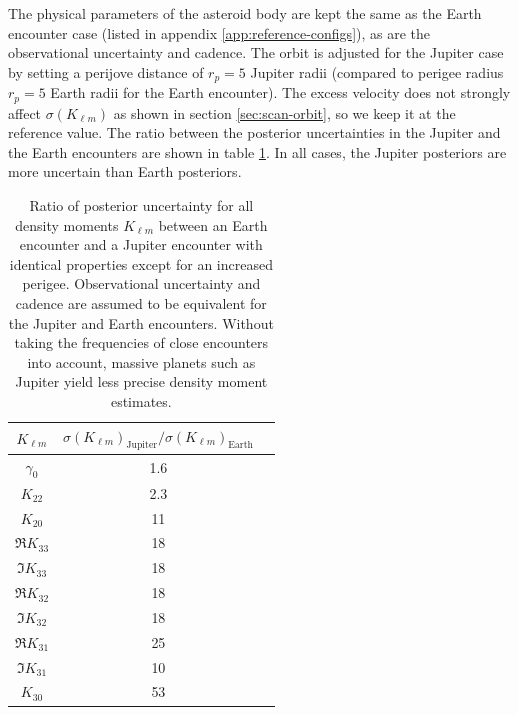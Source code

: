 \documentclass[fleqn,usenatbib]{mnras}
\begin{document}
The physical parameters of the asteroid body are kept the same as the Earth encounter case (listed in appendix \ref{app:reference-configs}), as are the observational uncertainty and cadence. The orbit is adjusted for the Jupiter case by setting a perijove distance of $r_p=5$ Jupiter radii (compared to perigee radius $r_p=5$ Earth radii for the Earth encounter). The excess velocity does not strongly affect $\sigma(K_{\ell m})$ as shown in section \ref{sec:scan-orbit}, so we keep it at the reference value. %
The ratio between the posterior uncertainties in the Jupiter and the Earth encounters are shown in table \ref{tab:jupiter-uncertainty}. In all cases, the Jupiter posteriors are more uncertain than Earth posteriors.

\begin{table}
  \centering
  \begin{tabular}{c|cc}
    \hline 
    $K_{\ell m}$ & $\sigma(K_{\ell m})_\text{Jupiter}/\sigma(K_{\ell m})_\text{Earth}$\\ \hline 
    $\gamma_0$ & 1.6 \\
    $K_{22}$ & 2.3 \\
    $K_{20}$ & 11 \\
    $\Re K_{33}$ & 18 \\
    $\Im K_{33}$ & 18 \\
    $\Re K_{32}$ & 18 \\
    $\Im K_{32}$ & 18 \\
    $\Re K_{31}$ & 25 \\
    $\Im K_{31}$ & 10 \\
    $K_{30}$ & 53 \\ \hline
  \end{tabular}
  \caption{Ratio of posterior uncertainty for all density moments $K_{\ell m}$ between an Earth encounter and a Jupiter encounter with identical properties except for an increased perigee. Observational uncertainty and cadence are assumed to be equivalent for the Jupiter and Earth encounters. Without taking the frequencies of close encounters into account, massive planets such as Jupiter yield less precise density moment estimates.}
  \label{tab:jupiter-uncertainty}
\end{table}
\end{document}
